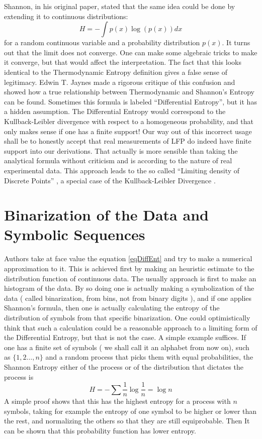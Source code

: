 \documentclass[10pt]{article}
\begin{document}
Shannon, in his original paper, stated that the same idea could be done by extending it to continuous distributions:
\begin{equation}
H=-\int p(x) \log (p(x)) d x
\end{equation}
for a random continuous variable and a probability distribution $p(x)$. It turns out that the limit does not converge. One can make some algebraic tricks to make it converge, but that would affect the interpretation. The fact that this looks identical to the Thermodynamic Entropy definition gives a false sense of legitimacy. Edwin T. Jaynes \cite{Jaynes1957}  made a rigorous critique of this confusion and showed how a true relationship between Thermodynamic and Shannon's Entropy can be found. Sometimes this formula is
labeled ``Differential Entropy'', but it has a hidden assumption.
The Differential Entropy would correspond to the Kullback-Leibler divergence
with respect to a homogeneous probability, and that only makes sense if one
has a finite support!
Our way out of this incorrect usage shall be to honestly accept that real measurements
of LFP do indeed have finite support into our derivations. That actually is more sensible than taking the analytical formula without criticism and is according to the nature of real experimental data. This approach leads to the so called ``Limiting density
of Discrete Points'' \cite{Jaynes1968, Jaynes2003}, a special case of the
Kullback-Leibler Divergence \cite{Kullback1959}.


\section{Binarization of the Data and Symbolic Sequences}

Authors take at face value the equation \ref{eqDiffEnt} and try to make a numerical approximation to it. This is achieved first by making an heuristic estimate to the distribution function of continuous data. The usually approach is first to make an histogram of the data. By so doing one is actually making a symbolization of the data ( called binarization, from bins, not from binary digits ), and if one applies Shannon's formula, then one is actually calculating the entropy of the distribution of symbols from that specific binarization. One could optimistically think that such a calculation could be a reasonable approach to a limiting form of the Differential Entropy, but that is not the case. A simple example suffices.
If one has a finite set of symbols ( we shall call it an alphabet from now on), such as $\{1,2\ldots,n\}$ and a random process that picks them with equal probabilities, the Shannon Entropy either of the process or of the distribution that dictates the process is 
$$
H=-\sum \frac{1}{n} \log \frac{1}{n} = \log n
$$
A simple proof shows that this has the highest entropy for a process with $n$ symbols, taking for example the entropy of one symbol to be higher or lower than the rest, and normalizing the others so that they are still equiprobable. Then It can be shown that this probability function has lower entropy. 
\end{document}
